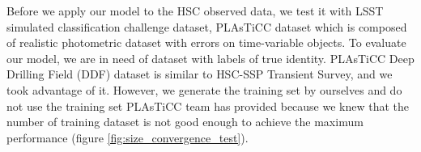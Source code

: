 \documentclass[useamsfonts]{pasj01}
\begin{document}


%
Before we apply our model to the HSC observed data, we test it with LSST simulated classification challenge dataset, PLAsTiCC dataset \citep{allam18a,malz19a} which is composed of realistic photometric dataset with errors on time-variable objects.
To evaluate our model, we are in need of dataset with labels of true identity. 
PLAsTiCC Deep Drilling Field (DDF) dataset is similar to HSC-SSP Transient Survey, and we took advantage of it.
However, %
we generate the training set by ourselves 
and do not use the training set PLAsTiCC team has provided because we knew that the number of training dataset is not good enough to achieve the maximum performance (figure \ref{fig:size_convergence_test}).
\end{document}

